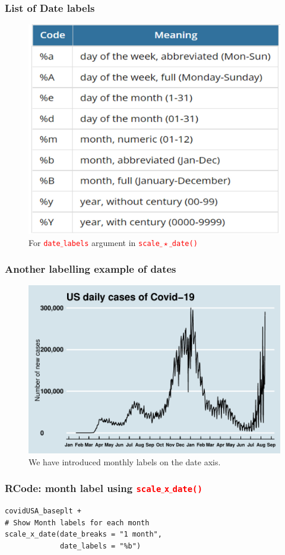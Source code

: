 \documentclass{beamer}
\begin{document}
\begin{frame}\frametitle{List of Date labels}
\begin{figure}
\includegraphics[width=0.80\linewidth]{PlotsLec4/DateLabels}
\caption{{\small For \texttt{\textcolor{red}{date$\_$labels}} argument in \texttt{\textcolor{red}{scale$\_\star \_$date()}}}}
\end{figure}
\end{frame}

\begin{frame}\frametitle{Another labelling example of dates}
\begin{figure}
\includegraphics[width=0.99\linewidth]{PlotsLec4/Covid19_US_3}
\caption{\small{We have introduced monthly labels on the date axis.}}
\end{figure}
\end{frame}

\begin{frame}[fragile]\frametitle{RCode: month label using \texttt{\textcolor{red}{scale$\_$x$\_$date()}}}
\begin{lstlisting}
covidUSA_baseplt +
# Show Month labels for each month
scale_x_date(date_breaks = "1 month",
             date_labels = "%b") 
\end{lstlisting}
\end{frame}
\end{document}
